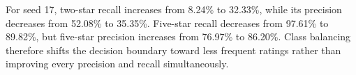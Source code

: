 For seed 17, two-star recall increases from 8.24\% to 32.33\%, while its precision decreases from 52.08\% to 35.35\%. Five-star recall decreases from 97.61\% to 89.82\%, but five-star precision increases from 76.97\% to 86.20\%. Class balancing therefore shifts the decision boundary toward less frequent ratings rather than improving every precision and recall simultaneously. 
